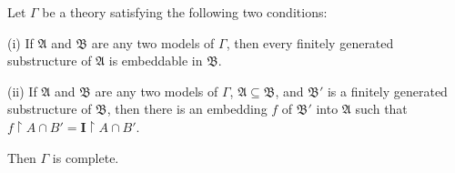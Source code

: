 Let $\Gamma$ be a theory satisfying the following two conditions:

(i) If $\mathfrak{A}$ and $\mathfrak{B}$ are any two models of $\Gamma$, then every finitely generated substructure of $\mathfrak{A}$ is embeddable in $\mathfrak{B}$.

(ii) If $\mathfrak{A}$ and $\mathfrak{B}$ are any two models of $\Gamma$, $\mathfrak{A} \subseteq \mathfrak{B}$, and $\mathfrak{B}'$ is a finitely generated substructure of $\mathfrak{B}$, then there is an embedding $f$ of $\mathfrak{B}'$ into $\mathfrak{A}$ such that $f \upharpoonright A \cap B' = \mathbf{I} \upharpoonright A \cap B'$.

Then $\Gamma$ is complete.
